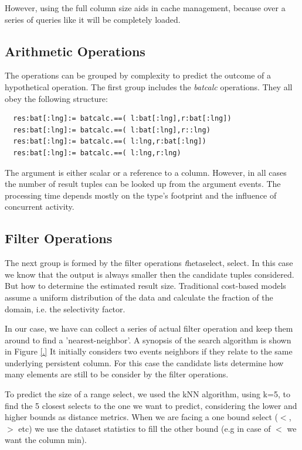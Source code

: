 \documentclass[conference]{IEEEtran}
\begin{document}
However, using the full column size aids in cache management, because over a series
of queries like it will be completely loaded.

\subsection{Arithmetic Operations}
The operations can be grouped by complexity to predict the outcome of a hypothetical operation. The first group includes the {\em batcalc} operations. They all obey the following structure:
\begin{verbatim}
  res:bat[:lng]:= batcalc.==( l:bat[:lng],r:bat[:lng])
  res:bat[:lng]:= batcalc.==( l:bat[:lng],r::lng)
  res:bat[:lng]:= batcalc.==( l:lng,r:bat[:lng])
  res:bat[:lng]:= batcalc.==( l:lng,r:lng)

\end{verbatim}
The argument is either scalar or a reference to a column. However, in all cases the number of result tuples can be looked up from the argument events. The processing time depends mostly on the type's footprint and the influence of concurrent activity.

\subsection{Filter Operations}
The next group is formed by the filter operations {\emph thetaselect, select}. In this case we know that the output is always smaller then the candidate tuples considered. But how to determine the estimated result size. Traditional cost-based models assume a uniform distribution of the data and calculate the fraction of the domain, i.e. the selectivity factor.

In our case, we have can collect a series of actual filter operation and keep them around to find a 'nearest-neighbor'. A synopsis of the search algorithm is shown in Figure \ref{.}
It initially considers two events neighbors if they relate to the same underlying persistent column. For this case the candidate lists determine how many elements are still to be consider by the filter operations.

To predict the size of a range select, we used the kNN algorithm,
using k=5, to find the 5 closest selects to the one we want to predict,
considering the lower and higher bounds as distance metrics.
When we are facing a one bound select ($<$,$>$ etc) we use the
dataset statistics to fill the other bound (e.g in case of $<$ we want the column min).
\end{document}
